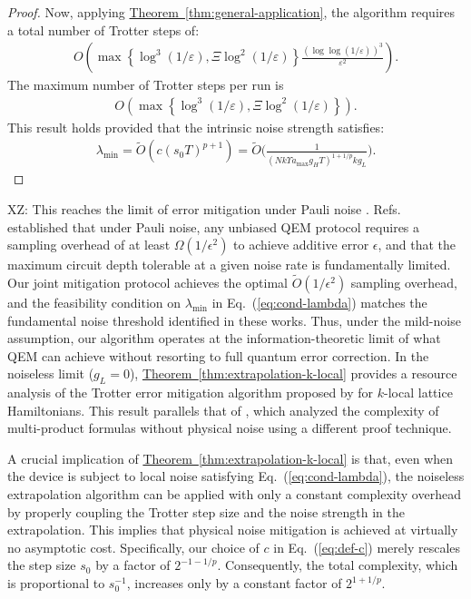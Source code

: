 \documentclass[aps,pra,reprint,groupedaddress,floatfix]{revtex4-2}
\newcommand{\eq}[1]{(\ref{eq:#1})}
\newcommand{\thm}[1]{\hyperref[thm:#1]{Theorem~\ref*{thm:#1}}}
\newcommand{\eps}{\varepsilon}
\newcommand{\xz}[1]{{\color{cyan} XZ: #1}}
\begin{document}
\begin{proof}
    Now, applying \thm{general-application}, the algorithm requires a total number of Trotter steps of:
    \begin{align*}
         O\left( \max\left\{\log^3(1/\eps), \Xi \log^2(1/\eps)\right\} \frac{(\log\log (1/\eps))^3}{\eps^2} \right).
    \end{align*}
    The maximum number of Trotter steps per run is
    \begin{align*}
  O\left( \max\left\{\log^3(1/\eps), \Xi \log^2(1/\eps)\right\} \right).
    \end{align*}
    This result holds provided that the intrinsic noise strength satisfies:
    \begin{align*}
        \lambda_{\min} = \widetilde{O}(c(s_0T)^{p+1}) = \widetilde{O}\Big(\frac{1}{ (Nk\Upsilon a_{\max}g_HT)^{1+1/p} kg_L }\Big).
    \end{align*}
\end{proof}
\xz{This reaches the limit of error mitigation under Pauli noise \cite{wang2021noise, cai2021multi}.}
Refs.~\cite{wang2021noise, cai2021multi} established that under Pauli noise, any unbiased QEM protocol requires a sampling overhead of at least $\Omega(1/\epsilon^2)$ to achieve additive error $\epsilon$, and that the maximum circuit depth tolerable at a given noise rate is fundamentally limited. Our joint mitigation protocol achieves the optimal $\widetilde{O}(1/\epsilon^2)$ sampling overhead, and the feasibility condition on $\lambda_{\min}$ in Eq.~(\ref{eq:cond-lambda}) matches the fundamental noise threshold identified in these works. Thus, under the mild-noise assumption, our algorithm operates at the information-theoretic limit of what QEM can achieve without resorting to full quantum error correction.
In the noiseless limit ($g_L = 0$), \thm{extrapolation-k-local} provides a resource analysis of the Trotter error mitigation algorithm proposed by \citet{watson2025exponentially} for $k$-local lattice Hamiltonians. This result parallels that of \citet{mizuta2025commutator}, which analyzed the complexity of multi-product formulas without physical noise using a different proof technique.

A crucial implication of \thm{extrapolation-k-local} is that, even when the device is subject to local noise satisfying Eq.~\eq{cond-lambda}, the noiseless extrapolation algorithm can be applied with only a constant complexity overhead by properly coupling the Trotter step size and the noise strength in the extrapolation. This implies that physical noise mitigation is achieved at virtually no asymptotic cost. Specifically, our choice of $c$ in Eq.~\eq{def-c} merely rescales the step size $s_0$ by a factor of $2^{-1-1/p}$. Consequently, the total complexity, which is proportional to $s_0^{-1}$, increases only by a constant factor of $2^{1+1/p}$.
\end{document}
